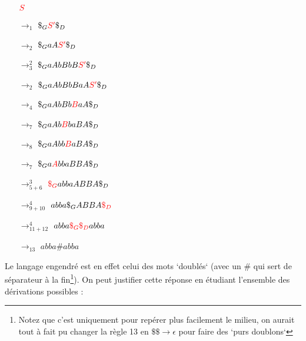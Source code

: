 \documentclass{article}[11pt]
\theoremstyle{definition}
\begin{document}
\begin{itemize}
\item[] $\textcolor{red}{S} $
\item[$\rightarrow_1$] $\$_G\textcolor{red}{S'}\$_D$ 
\item[$\rightarrow_2$] $\$_GaA\textcolor{red}{S'}\$_D$
\item[$\rightarrow_3^2$] $\$_GaAbBbB\textcolor{red}{S'}\$_D$
\item[$\rightarrow_2$] $\$_GaAbBbBaA\textcolor{red}{S'}\$_D$
\item[$\rightarrow_4$] $\$_GaAbBb\textcolor{red}{B}aA\$_D$
\item[$\rightarrow_7$] $\$_GaAb\textcolor{red}{B}baBA\$_D$
\item[$\rightarrow_8$] $\$_GaAbb\textcolor{red}{B}aBA\$_D$
\item[$\rightarrow_7$] $\$_Ga\textcolor{red}{A}bbaBBA\$_D$
\item[$\rightarrow_{5+6}^3$] $\textcolor{red}{\$_G}abbaABBA\$_D$
\item[$\rightarrow_{9+10}^4$] $abba\$_GABBA\textcolor{red}{\$_D}$
\item[$\rightarrow_{11+12}^4$] $abba\textcolor{red}{\$_G\$_D}abba$
\item[$\rightarrow_{13}$] $abba\#abba$
\end{itemize}

\noindent
Le langage engendré est en effet celui des mots `doublés` (avec un \# qui sert de séparateur à la fin\footnote{Notez que c'est uniquement pour repérer plus facilement le milieu, on aurait tout à fait pu changer la règle 13 en $\$\$ \rightarrow \epsilon$ pour faire des `purs doublons`}). On peut justifier cette réponse en étudiant l'ensemble des dérivations possibles :\newline
\end{document}

